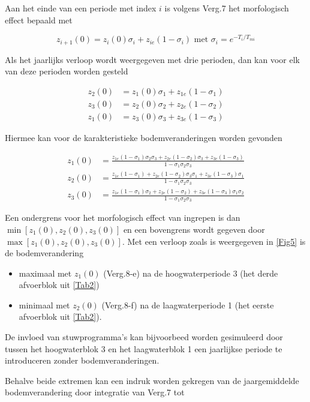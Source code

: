 Aan het einde van een periode met index $i$ is volgens Verg.7 het morfologisch effect bepaald met

\begin{equation}
z_{i+1}(0) = z_i (0) \sigma_i + z_{ie} (1-\sigma_i) \text{ met } \sigma_i = e^{-T_i/T_{mi}}
\end{equation}

Als het jaarlijks verloop wordt weergegeven met drie perioden, dan kan voor elk van deze perioden worden gesteld

\begin{align}
z_2(0) &= z_1 (0) \sigma_1 + z_{1e} (1-\sigma_1) \\
z_3(0) &= z_2 (0) \sigma_2 + z_{2e} (1-\sigma_2) \\
z_1(0) &= z_3 (0) \sigma_3 + z_{3e} (1-\sigma_3)
\end{align}

Hiermee kan voor de karakteristieke bodemveranderingen worden gevonden

\begin{align}
z_1(0) &= \frac{z_{1e} (1-\sigma_1) \sigma_2 \sigma_3 + z_{2e} (1-\sigma_2) \sigma_3 + z_{3e} (1-\sigma_3)}{1 - \sigma_1 \sigma_2 \sigma_3} \\
z_2(0) &= \frac{z_{1e} (1-\sigma_1) + z_{2e} (1-\sigma_2) \sigma_3 \sigma_1 + z_{3e} (1-\sigma_3) \sigma_1}{1 - \sigma_1 \sigma_2 \sigma_3} \\
z_3(0) &= \frac{z_{1e} (1-\sigma_1) \sigma_2 + z_{2e} (1-\sigma_2) + z_{3e} (1-\sigma_3) \sigma_1 \sigma_2}{1 - \sigma_1 \sigma_2 \sigma_3}
\end{align}

Een ondergrens voor het morfologisch effect van ingrepen is dan $\min[z_1(0), z_2(0), z_3(0)]$ en een bovengrens wordt gegeven door $\max[z_1(0), z_2(0), z_3(0)]$.
Met een verloop zoals is weergegeven in \autoref{Fig5} is de bodemverandering
\begin{itemize}
\item maximaal met $z_1(0)$ (Verg.8-e) na de hoogwaterperiode 3 (het derde afvoerblok uit \autoref{Tab2})
\item minimaal met $z_2(0)$ (Verg.8-f) na de laagwaterperiode 1 (het eerste afvoerblok uit \autoref{Tab2}).
\end{itemize}

De invloed van stuwprogramma's kan bijvoorbeed worden gesimuleerd door tussen het hoogwaterblok 3 en het laagwaterblok 1 een jaarlijkse periode te introduceren zonder bodemveranderingen.

Behalve beide extremen kan een indruk worden gekregen van de jaargemiddelde bodemverandering door integratie van Verg.7 tot

